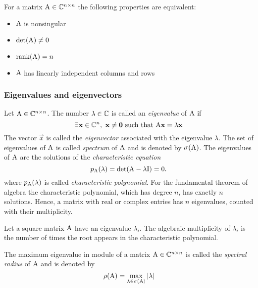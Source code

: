 \begin{proposition}
    For a matrix $\mathrm{A} \in \mathbb{C}^{n \times n}$ the following properties are equivalent:
    \begin{itemize}
        \item $\mathrm{A}$ is nonsingular
        \item $\mathrm{det}{(\mathrm{A})} \neq 0$
        \item $\mathrm{rank}(\mathrm{A}) = n$
        \item $\mathrm{A}$ has linearly independent columns and rows
    \end{itemize}
\end{proposition}



\subsubsection{Eigenvalues and eigenvectors}

\begin{definition}
    Let $\mathrm{A} \in \mathbb{C}^{n\times n}$. The number $\lambda \in \mathbb{C}$ is called an \textit{eigenvalue} of $\mathrm{A}$ if
    $$ \exists \mathbf{x} \in \mathbb{C}^n,\ \mathbf{x} \neq \mathbf{0}\ \text{such that } \mathrm{A}\mathbf{x} = \lambda\mathbf{x} $$
    The vector $\vec{x}$ is called the \textit{eigenvector} associated with the eigenvalue $\lambda$. The set of eigenvalues of $\mathrm{A}$ is called \textit{spectrum} of $\mathrm{A}$ and is denoted by $\sigma(\mathrm{A})$. The eigenvalues of $\mathrm{A}$ are the solutions of the \textit{characteristic equation}
    $$ p_{\mathrm{A}}(\lambda) = \mathrm{det}{(\mathrm{A} - \lambda\mathrm{I})} = 0. $$
    where $p_{\mathrm{A}}(\lambda)$ is called \textit{characteristic polynomial}. For the fundamental theorem of algebra the characteristic polynomial, which has degree $n$, has exactly $n$ solutions. Hence, a matrix with real or complex entries has $n$ eigenvalues, counted with their multiplicity.
\end{definition}

\begin{definition}
Let a square matrix $\mathrm{A}$ have an eigenvalue $\lambda_i$. The algebraic multiplicity of $\lambda_i$ is the number of times the root appears in the characteristic polynomial.
\end{definition}

\begin{definition}
    The maximum eigenvalue in module of a matrix $\mathrm{A} \in \mathbb{C}^{n \times n}$ is called the \textit{spectral radius} of $\mathrm{A}$ and is denoted by
    $$ \rho(\mathrm{A}) = \max_{\lambda \in \sigma(\mathrm{A})}{\left\vert \lambda \right\vert} $$
\end{definition}

